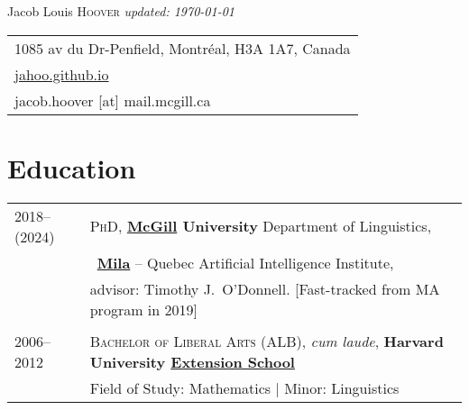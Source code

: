 \documentclass[11pt,a4paper]{article}
\begin{document}
\pagestyle{empty}
\Huge{Jacob Louis \scshape{Hoover}}
\small\textit{\hfill updated: \today}

\begin{tabular}{p{\textwidth-12pt}}
  1085 av du Dr-Penfield, Montréal, H3A 1A7, Canada\\
  \href{http://jahoo.github.io}{jahoo.github.io}\\
  jacob.hoover [at] mail.mcgill.ca\\
\end{tabular}

\vspace*{10pt}

\section{Education}

\begin{longtable}{p{1.7cm}|p{15cm}}
  2018--(2024)%
    &%
    \textsc{PhD},
    \textbf{\href{https://www.mcgill.ca/linguistics/graduate}{McGill} University}
    Department of Linguistics,\\
    &\qquad~\href{http://mila.quebec}{\textbf{Mila}} -- Quebec Artificial
    Intelligence Institute,\\
    &%
    advisor: Timothy J.\ O'Donnell. [Fast-tracked from MA program in 2019]\\
    \multicolumn{2}{c}{}\\
  2006--2012%
    &%
    \textsc{Bachelor of Liberal Arts (ALB)}, \emph{cum laude},
    \textbf{Harvard University \href{https://extension.harvard.edu/}{Extension School}}\\
    &%
    Field of Study: Mathematics | Minor: Linguistics\\
  \end{longtable}
\end{document}
